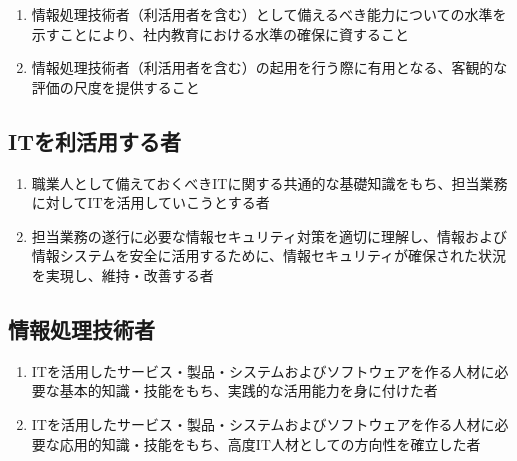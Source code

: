 




\begin{enumerate}
\item {}情報処理技術者（利活用者を含む）として備えるべき能力についての水準を示すことにより、社内教育における水準の確保に資すること
\item 情報処理技術者（利活用者を含む）の起用を行う際に有用となる、客観的な評価の尺度を提供すること
\end{enumerate}




\subsection{ITを利活用する者}
\begin{enumerate}[label*=\Roman*., ref=\Roman*]
\item\label{item:ITseg1}
職業人として備えておくべきITに関する共通的な基礎知識をもち、担当業務に対してITを活用していこうとする者
\item\label{item:ITseg2}
担当業務の遂行に必要な情報セキュリティ対策を適切に理解し、情報および情報システムを安全に活用するために、情報セキュリティが確保された状況を実現し、維持・改善する者
\end{enumerate}

\subsection{情報処理技術者}
\begin{enumerate}[start=3, label*=\Roman*., ref=\Roman*]
\item\label{item:ITseg3}
ITを活用したサービス・製品・システムおよびソフトウェアを作る人材に必要な基本的知識・技能をもち、実践的な活用能力を身に付けた者
\item\label{item:ITseg4}
ITを活用したサービス・製品・システムおよびソフトウェアを作る人材に必要な応用的知識・技能をもち、高度IT人材としての方向性を確立した者
\end{enumerate}



